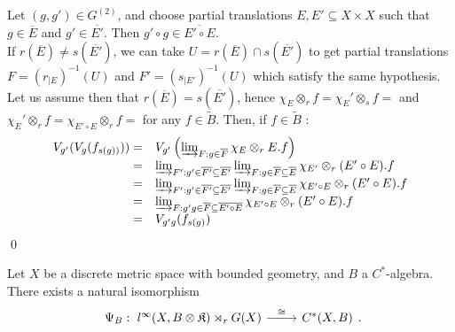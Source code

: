 \begin{dem}
Let $(g,g')\in G^{(2)}$, and choose partial translations $E, E'\subseteq X\times X$ such that $g\in \overline E$ and $g'\in \overline{E'}$. Then $g'\circ g\in \overline{E'\circ E}$.\\

If $r(\overline E)\neq s(\overline {E'})$, we can take $U=r(\overline E)\cap s(\overline {E'})$ to get partial translations $F = (r_{|E})^{-1}(U)$ and $F' = (s_{|E'})^{-1}(U)$ which satisfy the same hypothesis. Let us assume then that $r(\overline E) = s(\overline {E'})$, hence $\chi_E\otimes_r f = \chi_E'\otimes_s f = $ and $\chi_E'\otimes_r f = \chi_{E'\circ E} \otimes_r f = $ for any $f\in \tilde B$. Then, if $f\in \tilde B$ :
\[\begin{array}{rl} V_{g'}(V_g(f_{s(g))})) =  & V_{g'}\left( \varinjlim_{F : g\in \overline F} \chi_E \otimes_r E.f\right) \\
				=&  \varinjlim_{F' : g'\in \overline{F'}\subseteq \overline{E'}}\varinjlim_{F : g\in \overline F\subseteq \overline E} \chi_{E'} \otimes_r (E'\circ E).f \\
				=& \varinjlim_{F' : g'\in \overline{F'}\subseteq \overline{E'}}\varinjlim_{F : g\in \overline F\subseteq \overline E} \chi_{E'\circ E} \otimes_r (E'\circ E).f \\
				=& \varinjlim_{F : g'g\in \overline{F}\subseteq \overline{E'\circ E}} \chi_{E'\circ E} \otimes_r (E'\circ E).f \\
				=& V_{g'g}(f_{s(g)})\\ 
\end{array} \] 
\qed
\end{dem}

\begin{thm}\label{IsomCoarseGroupoid}
Let $X$ be a discrete metric space with bounded geometry, and $B$ a $C^*$-algebra. There exists a natural isomorphism 
\[\begin{tikzcd}\Psi_B :  \ l^\infty(X,B\otimes\mathfrak K)\rtimes_r G(X) \arrow{r}{\cong} &   C^*(X,B)\end{tikzcd}.\] 
\end{thm}

